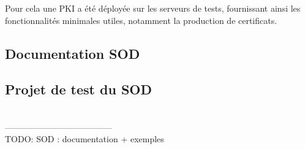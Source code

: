 Pour cela une PKI a été déployée sur les serveurs de tests, fournissant ainsi les fonctionnalités minimales utiles, notamment la production de certificats.
\\





\subsection{Documentation SOD}



\subsection{Projet de test du SOD}



~~\\--------------------------------------~~\\
TODO:
SOD : documentation + exemples